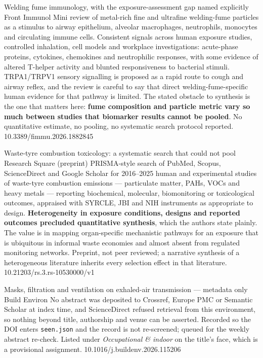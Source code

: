 \documentclass[10pt]{article}
\begin{document}
{Welding fume immunology, with the exposure-assessment gap named explicitly}
{Front Immunol}
{Mini review of metal-rich fine and ultrafine welding-fume particles as a stimulus to
airway epithelium, alveolar macrophages, neutrophils, monocytes and circulating immune
cells. Consistent signals across human exposure studies, controlled inhalation, cell models
and workplace investigations: acute-phase proteins, cytokines, chemokines and neutrophilic
responses, with some evidence of altered T-helper activity and blunted responsiveness to
bacterial stimuli. TRPA1/TRPV1 sensory signalling is proposed as a rapid route to cough and
airway reflex, and the review is careful to say that direct welding-fume-specific human
evidence for that pathway is limited. The stated obstacle to synthesis is the one that
matters here: \textbf{fume composition and particle metric vary so much between studies
that biomarker results cannot be pooled}. No quantitative estimate, no pooling, no
systematic search protocol reported.}
{10.3389/fimmu.2026.1882845}

{Waste-tyre combustion toxicology: a systematic search that could not pool}
{Research Square (preprint)}
{PRISMA-style search of PubMed, Scopus, ScienceDirect and Google Scholar for 2016--2025
human and experimental studies of waste-tyre combustion emissions --- particulate matter,
PAHs, VOCs and heavy metals --- reporting biochemical, molecular, biomonitoring or
toxicological outcomes, appraised with SYRCLE, JBI and NIH instruments as appropriate to
design. \textbf{Heterogeneity in exposure conditions, designs and reported outcomes
precluded quantitative synthesis}, which the authors state plainly. The value is in
mapping organ-specific mechanistic pathways for an exposure that is ubiquitous in informal
waste economies and almost absent from regulated monitoring networks. Preprint, not peer
reviewed; a narrative synthesis of a heterogeneous literature inherits every selection
effect in that literature.}
{10.21203/rs.3.rs-10530000/v1}

{Masks, filtration and ventilation on exhaled-air transmission --- metadata only}
{Build Environ}
{No abstract was deposited to Crossref, Europe PMC or Semantic Scholar at index time, and
ScienceDirect refused retrieval from this environment, so nothing beyond title, authorship
and venue can be asserted. Recorded so the DOI enters \texttt{seen.json} and the record
is not re-screened; queued for the weekly abstract re-check. Listed under
\textit{Occupational \& indoor} on the title's face, which is a provisional assignment.}
{10.1016/j.buildenv.2026.115206}
\end{document}
